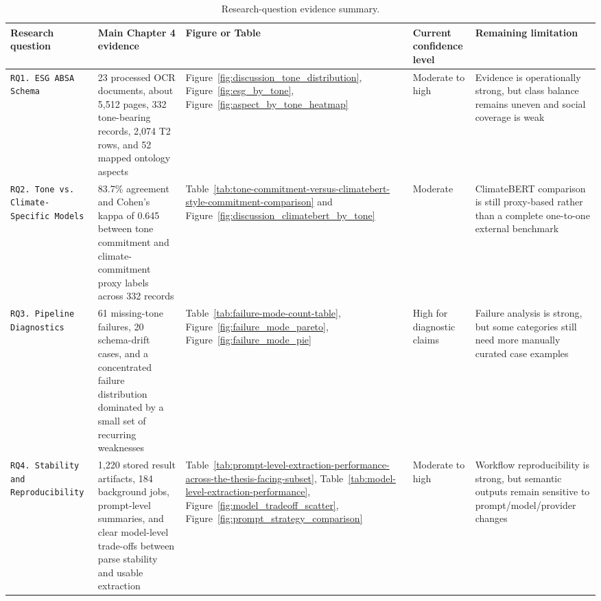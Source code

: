 \begin{table}[htbp]
\centering
\caption{Research-question evidence summary.}
\label{tab:research-question-evidence-summary}
\footnotesize
\setlength{\tabcolsep}{4pt}
\renewcommand{\arraystretch}{1.15}
\begin{tabularx}{\linewidth}{|p{2cm}|X|p{2cm}|p{2cm}|X|}
\hline
\textbf{Research question} & \textbf{Main Chapter 4 evidence} & \textbf{Figure or Table} & \textbf{Current confidence level} & \textbf{Remaining limitation} \\ \hline
\texttt{RQ1. ESG ABSA Schema} & 23 processed OCR documents, about 5,512 pages, 332 tone-bearing records, 2,074 T2 rows, and 52 mapped ontology aspects & Figure~\ref{fig:discussion_tone_distribution}, Figure~\ref{fig:esg_by_tone}, Figure~\ref{fig:aspect_by_tone_heatmap} & Moderate to high & Evidence is operationally strong, but class balance remains uneven and social coverage is weak \\ \hline
\texttt{RQ2. Tone vs. Climate-Specific Models} & 83.7\% agreement and Cohen's kappa of 0.645 between tone commitment and climate-commitment proxy labels across 332 records & Table~\ref{tab:tone-commitment-versus-climatebert-style-commitment-comparison} and Figure~\ref{fig:discussion_climatebert_by_tone} & Moderate & ClimateBERT comparison is still proxy-based rather than a complete one-to-one external benchmark \\ \hline
\texttt{RQ3. Pipeline Diagnostics} & 61 missing-tone failures, 20 schema-drift cases, and a concentrated failure distribution dominated by a small set of recurring weaknesses & Table~\ref{tab:failure-mode-count-table}, Figure~\ref{fig:failure_mode_pareto}, Figure~\ref{fig:failure_mode_pie} & High for diagnostic claims & Failure analysis is strong, but some categories still need more manually curated case examples \\ \hline
\texttt{RQ4. Stability and Reproducibility} & 1,220 stored result artifacts, 184 background jobs, prompt-level summaries, and clear model-level trade-offs between parse stability and usable extraction & Table~\ref{tab:prompt-level-extraction-performance-across-the-thesis-facing-subset}, Table~\ref{tab:model-level-extraction-performance}, Figure~\ref{fig:model_tradeoff_scatter}, Figure~\ref{fig:prompt_strategy_comparison} & Moderate to high & Workflow reproducibility is strong, but semantic outputs remain sensitive to prompt/model/provider changes \\ \hline
\end{tabularx}
\end{table}

